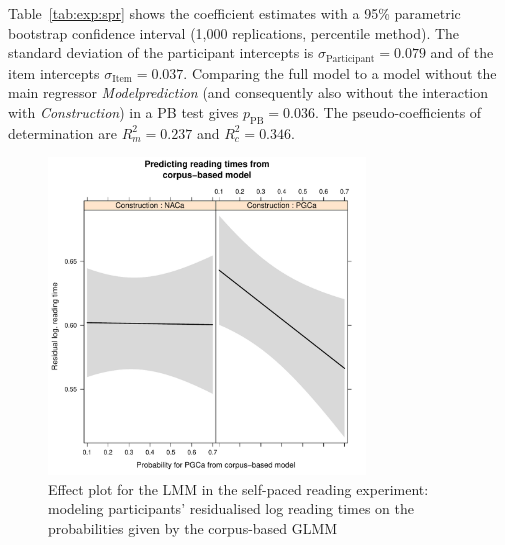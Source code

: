 \documentclass[USenglish]{article}
\newcommand{\mpPB}{\ensuremath{p_{\text{PB}}}}
\begin{document}
Table~\ref{tab:exp:spr} shows the coefficient estimates with a 95\% parametric bootstrap confidence interval (1,000 replications, percentile method).
The standard deviation of the participant intercepts is $\sigma_{\text{Participant}}=0.079$ and of the item intercepts $\sigma_{\text{Item}}=0.037$.
Comparing the full model to a model without the main regressor \textit{Modelprediction} (and consequently also without the interaction with \textit{Construction}) in a PB test gives $\mpPB=0.036$.
The pseudo-coefficients of determination are $R^2_m=0.237$ and $R^2_c=0.346$.

\begin{figure}[h]
\centering
\includegraphics[width=0.75\textwidth]{../R/output/spr_effects}
\caption{Effect plot for the LMM in the self-paced reading experiment: modeling participants' residualised log reading times on the probabilities given by the corpus-based GLMM}
\label{fig:spr:effects}
\end{figure}
\end{document}

